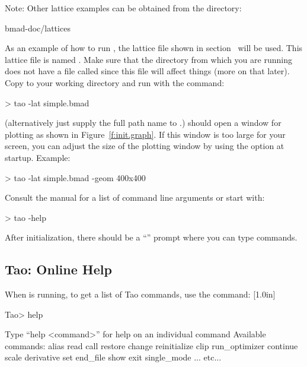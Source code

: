 \documentclass{hitec}     %
\begin{document}
Note: Other lattice examples can be obtained from the directory:
\begin{code}
bmad-doc/lattices
\end{code}

As an example of how to run \tao, the lattice file shown in section~ will be
used. This lattice file is named .  Make sure that the directory from which you are
running \tao does not have a file called  since this file will affect things (more on
that later). Copy  to your working directory and run \tao with the command:
\begin{code}
> tao -lat simple.bmad
\end{code}
(alternatively just supply the full path name to .)  \tao should open a window for
plotting as shown in Figure~\ref{f:init.graph}. If this window is too large for your screen, you can
adjust the size of the plotting window by using the  option at startup. Example:
\begin{code}
> tao -lat simple.bmad -geom 400x400
\end{code}
Consult the \tao manual for a list of command line arguments or start \tao with:
\begin{code}
> tao -help
\end{code}

After initialization, there should be a ``'' prompt where you can type \tao commands.

\subsection{Tao: Online Help}

When \tao is running, to get a list of Tao commands, use the  command:
%
[1.0in]
%
\begin{code}
Tao> help

Type ``help <command>'' for help on an individual command
Available commands:
  alias                             read
  call                              restore
  change                            reinitialize
  clip                              run_optimizer
  continue                          scale
  derivative                        set
  end_file                          show
  exit                              single_mode
... etc...
\end{code}
\end{document}
